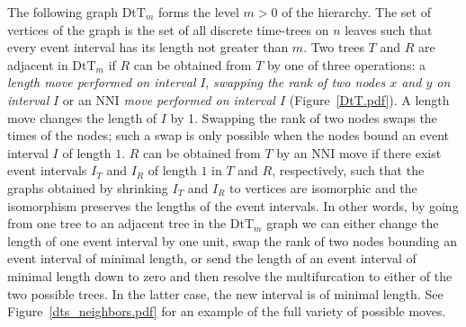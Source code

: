 \documentclass[11pt]{amsart}
\theoremstyle{definition}
\newcommand{\nni}{\mathrm{NNI}}
\newcommand{\dtt}{\mathrm{DtT}}
\begin{document}
The following graph $\dtt_m$ forms the level $m > 0$ of the hierarchy.
The set of vertices of the graph is the set of all discrete time-trees on $n$ leaves such that every event interval has its length not greater than $m$.
Two trees $T$ and $R$ are adjacent in $\dtt_m$ if $R$ can be obtained from $T$ by one of three operations: a \emph{length move performed on interval} $I$, \emph{swapping the rank of two nodes $x$ and $y$ on interval} $I$ or an \emph{$\nni$ move performed on interval $I$} (Figure~\ref{DtT.pdf}).
A length move changes the length of $I$ by 1.
Swapping the rank of two nodes swaps the times of the nodes; such a swap is only possible when the nodes bound an event interval $I$ of length $1$.
$R$ can be obtained from $T$ by an $\nni$ move if there exist event intervals $I_T$ and $I_R$ of length $1$ in $T$ and $R$, respectively, such that the graphs obtained by shrinking $I_T$ and $I_R$ to vertices are isomorphic and the isomorphism preserves the lengths of the event intervals.
In other words, by going from one tree to an adjacent tree in the $\dtt_m$ graph we can either change the length of one event interval by one unit, swap the rank of two nodes bounding an event interval of minimal length, or send the length of an event interval of minimal length down to zero and then resolve the multifurcation to either of the two possible trees.
In the latter case, the new interval is of minimal length.
See Figure~\ref{dts_neighbors.pdf} for an example of the full variety of possible moves.
\end{document}
